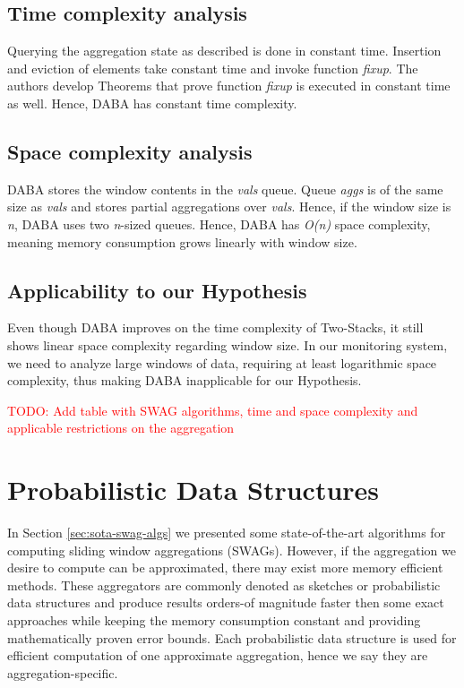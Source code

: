 \subsection*{Time complexity analysis}
Querying the aggregation state as described is done in constant time. Insertion and eviction of elements take constant time and invoke function \textit{fixup}. The authors develop Theorems that prove function \textit{fixup} is executed in constant time as well. Hence, DABA has constant time complexity.

\subsection*{Space complexity analysis}
DABA stores the window contents in the \textit{vals} queue. Queue \textit{aggs} is of the same size as \textit{vals} and stores partial aggregations over \textit{vals}. Hence, if the window size is \textit{n}, DABA uses two \textit{n}-sized queues. Hence, DABA has \textit{O(n)} space complexity, meaning memory consumption grows linearly with window size.

\subsection*{Applicability to our Hypothesis}
Even though DABA improves on the time complexity of Two-Stacks, it still shows linear space complexity regarding window size. In our monitoring system, we need to analyze large windows of data, requiring at least logarithmic space complexity, thus making DABA inapplicable for our Hypothesis.


\textcolor{red}{TODO: Add table with SWAG algorithms, time and space complexity and applicable restrictions on the aggregation}

\section{Probabilistic Data Structures} \label{sec:pds}
In Section \ref{sec:sota-swag-algs} we presented some state-of-the-art algorithms for computing sliding window aggregations (SWAGs). However, if the aggregation we desire to compute can be approximated, there may exist more memory efficient methods. These aggregators are commonly denoted as sketches or probabilistic data structures and produce results orders-of magnitude faster then some exact approaches while keeping the memory consumption constant and providing mathematically proven error bounds. Each probabilistic data structure is used for efficient computation of one approximate aggregation, hence we say they are aggregation-specific.

